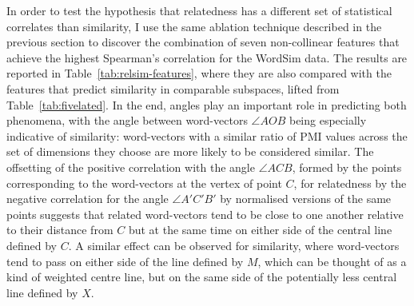In order to test the hypothesis that relatedness has a different set of statistical correlates than similarity, I use the same ablation technique described in the previous section to discover the combination of seven non-collinear features that achieve the highest Spearman's correlation for the WordSim data.  The results are reported in Table~\ref{tab:relsim-features}, where they are also compared with the features that predict similarity in comparable subspaces, lifted from Table~\ref{tab:fivelated}.  In the end, angles play an important role in predicting both phenomena, with the angle between word-vectors $\angle AOB$ being especially indicative of similarity: word-vectors with a similar ratio of PMI values across the set of dimensions they choose are more likely to be considered similar.  The offsetting of the positive correlation with the angle $\angle ACB$, formed by the points corresponding to the word-vectors at the vertex of point $C$, for relatedness by the negative correlation for the angle $\angle A'C'B'$ by normalised versions of the same points suggests that related word-vectors tend to be close to one another relative to their distance from $C$ but at the same time on either side of the central line defined by $C$.  A similar effect can be observed for similarity, where word-vectors tend to pass on either side of the line defined by $M$, which can be thought of as a kind of weighted centre line, but on the same side of the potentially less central line defined by $X$.

